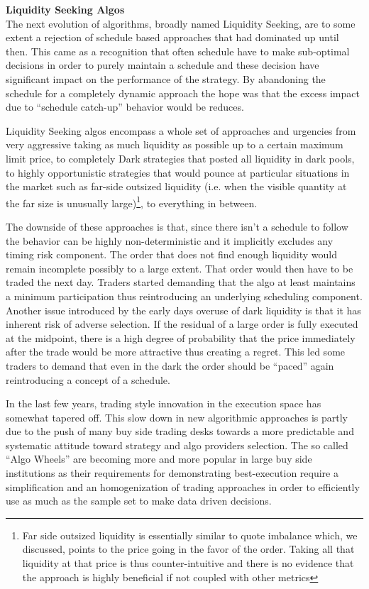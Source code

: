 \noindent\textbf{Liquidity Seeking Algos} \\


The next evolution of algorithms, broadly named Liquidity Seeking, are to some extent a rejection of schedule based approaches that had dominated up until then. This came as a recognition that often schedule have to make sub-optimal decisions in order to purely maintain a schedule and these decision have significant impact on the performance of the strategy. By abandoning the schedule for a completely dynamic approach the hope was that the excess impact due to ``schedule catch-up'' behavior would be reduces.


Liquidity Seeking algos encompass a whole set of approaches and urgencies from very aggressive taking as much liquidity as possible up to a certain maximum limit price, to completely Dark strategies that posted all liquidity in dark pools, to highly opportunistic strategies that would pounce at particular situations in the market such as far-side outsized liquidity (i.e. when the visible quantity at the far size is unusually large)\footnote{Far side outsized liquidity is essentially similar to quote imbalance which, we discussed, points to the price going in the favor of the order. Taking all that liquidity at that price is thus counter-intuitive and there is no evidence that the approach is highly beneficial if not coupled with other metrics}, to everything in between.


The downside of these approaches is that, since there isn't a schedule to follow the behavior can be highly non-deterministic and it implicitly excludes any timing risk component. The order that does not find enough liquidity would remain incomplete possibly to a large extent. That order would then have to be traded the next day. Traders started demanding that the algo at least maintains a minimum participation thus reintroducing an underlying scheduling component. Another issue introduced by the early days overuse of dark liquidity is that it has inherent risk of adverse selection. If the residual of a large order is fully executed at the midpoint, there is a high degree of probability that the price immediately after the trade would be more attractive thus creating a regret. This led some traders to demand that even in the dark the order should be ``paced'' again reintroducing a concept of a schedule.


In the last few years, trading style innovation in the execution space has somewhat tapered off. This slow down in new algorithmic approaches is partly due to the push of many buy side trading desks towards a more predictable and systematic attitude toward strategy and algo providers selection. The so called ``Algo Wheels'' are becoming more and more popular in large buy side institutions as their requirements for demonstrating best-execution require a simplification and an homogenization of trading approaches in order to  efficiently use as much as the sample set to make data driven decisions. 


